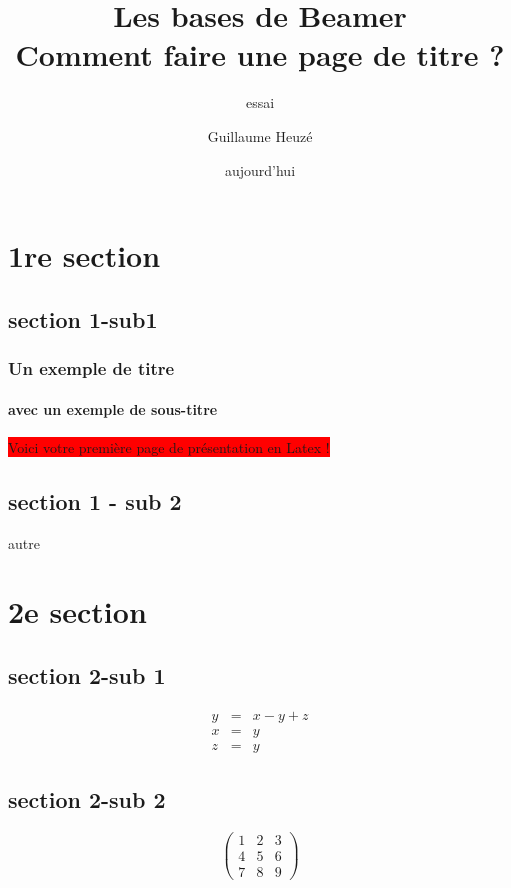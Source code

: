 \documentclass{beamer} %
\title[Faire une présentation en Latex avec Beamer]{Les bases de Beamer\\Comment faire une page de titre ?}
\subtitle{essai}
\author{Guillaume Heuzé}
\institute{Santé publique France}
\date{aujourd'hui}
\begin{document}
\begin{frame}
\titlepage
\end{frame}

\section{1re section}
\subsection{section 1-sub1}
	\begin{frame}[label=pagebanale]
	\frametitle{Un exemple de titre}
	\framesubtitle{avec un exemple de sous-titre}
		\colorbox{red}{Voici votre première page de présentation en Latex !}
	\end{frame}

\subsection{section 1 - sub 2}
	\begin{frame}
	autre
	\end{frame}

\section{2e section}
\subsection{section 2-sub 1}
	\begin{frame}
	\begin{align}
	y &=& x - y + z\\
	x &=& y\\
	z &=&y
	\end{align}
	\end{frame}

\subsection{section 2-sub 2}
	\begin{frame}
	\[
	\begin{pmatrix}
	1 & 2 & 3 \\
	4 & 5 & 6 \\
	7 & 8 & 9 
	\end{pmatrix}
	\]
	\end{frame}
\end{document}
